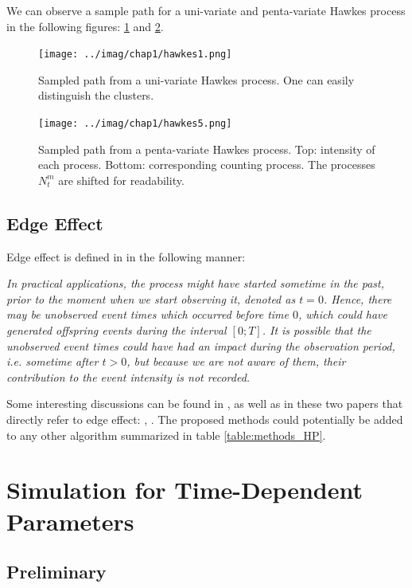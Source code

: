 \documentclass[11pt]{book}
\begin{document}
We can observe a sample path for a uni-variate and penta-variate Hawkes process in the following figures: \ref{fig:hawkes1} and \ref{fig:hawkes5}.

\begin{figure}
\centering
\texttt{[image: ../imag/chap1/hawkes1.png]}
\caption{Sampled path from a uni-variate Hawkes process. One can easily distinguish the clusters.}
\label{fig:hawkes1}
\end{figure}


\begin{figure}
\centering
\texttt{[image: ../imag/chap1/hawkes5.png]}
\caption{Sampled path from a penta-variate Hawkes process. Top: intensity of each process. Bottom: corresponding counting process. The processes $N_t^m$ are shifted for readability.}
\label{fig:hawkes5}
\end{figure}

\subsection{Edge Effect}
\label{subsection:edge}
Edge effect is defined in \cite{socialhawkes} in the following manner:

\textit{In practical applications, the process might have started sometime in the past, prior to the moment when we start observing it, denoted as $t = 0$. Hence, there may be unobserved event times which occurred before time $0$, which could have generated offspring events during the interval $[0;T]$. It is possible that the unobserved event times could have had an impact during the observation period, i.e. sometime after $t > 0$, but because we are not aware of them, their contribution to the event intensity is not recorded.}


Some interesting discussions can be found in \cite{daley}, as well as in these two papers that directly refer to edge effect: \cite{cox}, \cite{rasmussen}. The proposed methods could potentially be added to any other algorithm summarized in table \ref{table:methods_HP}.




\section{Simulation for Time-Dependent Parameters}
\subsection{Preliminary}
\end{document}
